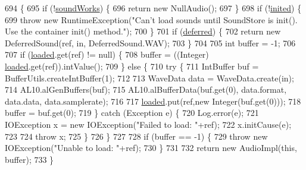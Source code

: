 \begin{DoxyCode}
694                                                                        \{
695         \textcolor{keywordflow}{if} (!\mbox{\hyperlink{classorg_1_1newdawn_1_1slick_1_1openal_1_1_sound_store_ae563e9c1a01e333dc2350f1450f451fd}{soundWorks}}) \{
696             \textcolor{keywordflow}{return} \textcolor{keyword}{new} NullAudio();
697         \}
698         \textcolor{keywordflow}{if} (!\mbox{\hyperlink{classorg_1_1newdawn_1_1slick_1_1openal_1_1_sound_store_ad607db06655c505a0d3aa73eb16a06e1}{inited}}) \{
699             \textcolor{keywordflow}{throw} \textcolor{keyword}{new} RuntimeException(\textcolor{stringliteral}{"Can't load sounds until SoundStore is init(). Use the container
       init() method."});
700         \}
701         \textcolor{keywordflow}{if} (\mbox{\hyperlink{classorg_1_1newdawn_1_1slick_1_1openal_1_1_sound_store_a19c18b8305a40c99b51cde881a6f1d32}{deferred}}) \{
702             \textcolor{keywordflow}{return} \textcolor{keyword}{new} DeferredSound(ref, in, DeferredSound.WAV);
703         \}
704         
705         \textcolor{keywordtype}{int} buffer = -1;
706         
707         \textcolor{keywordflow}{if} (\mbox{\hyperlink{classorg_1_1newdawn_1_1slick_1_1openal_1_1_sound_store_a886b8963df160c2a880f5a33e37397fc}{loaded}}.get(ref) != null) \{
708             buffer = ((Integer) \mbox{\hyperlink{classorg_1_1newdawn_1_1slick_1_1openal_1_1_sound_store_a886b8963df160c2a880f5a33e37397fc}{loaded}}.get(ref)).intValue();
709         \} \textcolor{keywordflow}{else} \{
710             \textcolor{keywordflow}{try} \{
711                 IntBuffer buf = BufferUtils.createIntBuffer(1);
712                 
713                 WaveData data = WaveData.create(in);
714                 AL10.alGenBuffers(buf);
715                 AL10.alBufferData(buf.get(0), data.format, data.data, data.samplerate);
716                 
717                 \mbox{\hyperlink{classorg_1_1newdawn_1_1slick_1_1openal_1_1_sound_store_a886b8963df160c2a880f5a33e37397fc}{loaded}}.put(ref,\textcolor{keyword}{new} Integer(buf.get(0)));
718                 buffer = buf.get(0);
719             \} \textcolor{keywordflow}{catch} (Exception e) \{
720                 Log.error(e);
721                 IOException x = \textcolor{keyword}{new} IOException(\textcolor{stringliteral}{"Failed to load: "}+ref);
722                 x.initCause(e);
723                 
724                 \textcolor{keywordflow}{throw} x;
725             \}
726         \}
727         
728         \textcolor{keywordflow}{if} (buffer == -1) \{
729             \textcolor{keywordflow}{throw} \textcolor{keyword}{new} IOException(\textcolor{stringliteral}{"Unable to load: "}+ref);
730         \}
731         
732         \textcolor{keywordflow}{return} \textcolor{keyword}{new} AudioImpl(\textcolor{keyword}{this}, buffer);
733     \}
\end{DoxyCode}
\mbox{\label{classorg_1_1newdawn_1_1slick_1_1openal_1_1_sound_store_a7fd1e14b653086f50974269e255533ac}} 
